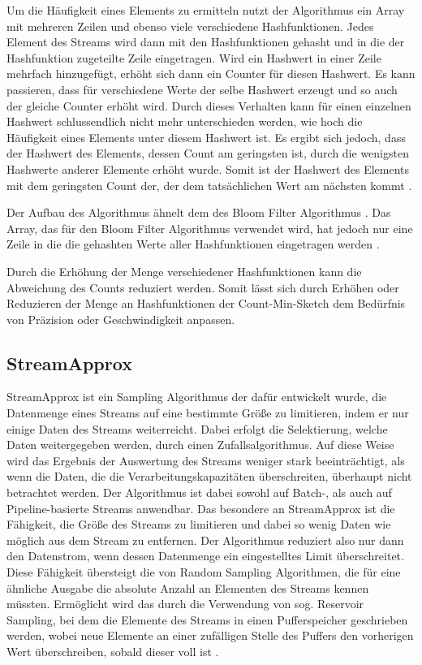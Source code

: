 Um die Häufigkeit eines Elements zu ermitteln 
nutzt der Algorithmus ein Array mit mehreren Zeilen 
und ebenso viele verschiedene Hashfunktionen. 
Jedes Element des Streams wird dann mit den Hashfunktionen gehasht 
und in die der Hashfunktion zugeteilte Zeile eingetragen. 
Wird ein Hashwert in einer Zeile mehrfach hinzugefügt, 
erhöht sich dann ein Counter für diesen Hashwert. 
Es kann passieren, dass für verschiedene Werte der selbe Hashwert erzeugt 
und so auch der gleiche Counter erhöht wird. 
Durch dieses Verhalten kann für einen einzelnen Hashwert 
schlussendlich nicht mehr unterschieden werden, 
wie hoch die Häufigkeit eines Elements unter diesem Hashwert ist. 
Es ergibt sich jedoch, dass der Hashwert des Elements, dessen Count am geringsten ist, 
durch die wenigsten Hashwerte anderer Elemente erhöht wurde. 
Somit ist der Hashwert des Elements mit dem geringsten Count der, 
der dem tatsächlichen Wert am nächsten kommt \cite{cormode2017}.

Der Aufbau des Algorithmus ähnelt dem des Bloom Filter Algorithmus \cite{cormode2017}. 
Das Array, das für den Bloom Filter Algorithmus verwendet wird, 
hat jedoch nur eine Zeile in die die gehashten Werte aller Hashfunktionen eingetragen werden \cite{cormode2017}.

Durch die Erhöhung der Menge verschiedener Hashfunktionen kann die Abweichung des Counts reduziert werden. 
Somit lässt sich durch Erhöhen oder Reduzieren der Menge an Hashfunktionen 
der Count-Min-Sketch dem Bedürfnis von Präzision oder Geschwindigkeit anpassen.

\subsection{StreamApprox}

StreamApprox ist ein Sampling Algorithmus der dafür entwickelt wurde, 
die Datenmenge eines Streams auf eine bestimmte Größe zu limitieren, 
indem er nur einige Daten des Streams weiterreicht. 
Dabei erfolgt die Selektierung, welche Daten weitergegeben werden, durch einen Zufallsalgorithmus. 
Auf diese Weise wird das Ergebnis der Auswertung des Streams weniger stark beeinträchtigt, 
als wenn die Daten, die die Verarbeitungskapazitäten überschreiten, 
überhaupt nicht betrachtet werden. 
Der Algorithmus ist dabei sowohl auf Batch-, als auch auf Pipeline-basierte Streams anwendbar.
Das besondere an StreamApprox ist die Fähigkeit, 
die Größe des Streams zu limitieren und dabei so wenig Daten wie möglich aus dem Stream zu entfernen. 
Der Algorithmus reduziert also nur dann den Datenstrom, wenn dessen Datenmenge ein eingestelltes Limit überschreitet. 
Diese Fähigkeit übersteigt die von Random Sampling Algorithmen, 
die für eine ähnliche Ausgabe die absolute Anzahl an Elementen des Streams kennen müssten. 
Ermöglicht wird das durch die Verwendung von sog. Reservoir Sampling, 
bei dem die Elemente des Streams in einen Pufferspeicher geschrieben werden, 
wobei neue Elemente an einer zufälligen Stelle des Puffers den vorherigen Wert überschreiben, sobald dieser voll ist \cite{quoc2017}. 

